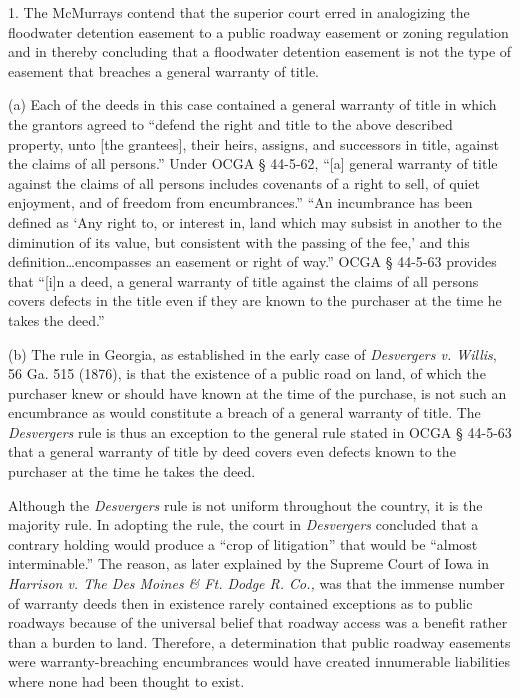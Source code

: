 1. The McMurrays contend that the superior court erred in analogizing the
floodwater detention easement to a public roadway easement or zoning regulation
and in thereby concluding that a floodwater detention easement is not the type
of easement that breaches a general warranty of title. 

(a) Each of the deeds in this case contained a general warranty of title in
which the grantors agreed to ``defend the right and title to the above
described property, unto [the grantees], their heirs, assigns, and successors
in title, against the claims of all persons.'' Under OCGA {\S} 44-5-62, ``[a]
general warranty of title against the claims of all persons includes covenants
of a right to sell, of quiet enjoyment, and of freedom from encumbrances.''
``An incumbrance has been defined as `Any right to, or interest in, land which
may subsist in another to the diminution of its value, but consistent with the
passing of the fee,' and this definition\ldots encompasses an easement or right
of way.'' OCGA {\S} 44-5-63 provides that ``[i]n a deed, a general warranty of
title against the claims of all persons covers defects in the title even if
they are known to the purchaser at the time he takes the deed.'' 

(b) The rule in Georgia, as established in the early case of \textit{Desvergers
v. Willis}, 56 Ga. 515 (1876), is that the existence of a public road on land,
of which the purchaser knew or should have known at the time of the purchase,
is not such an encumbrance as would constitute a breach of a general warranty
of title. The \textit{Desvergers }rule is thus an exception to the general rule
stated in OCGA {\S} 44-5-63 that a general warranty of title by deed covers
even defects known to the purchaser at the time he takes the deed. 

Although the \textit{Desvergers }rule is not uniform throughout the country, it
is the majority rule. In adopting the rule, the court in \textit{Desvergers
}concluded that a contrary holding would produce a ``crop of litigation'' that
would be ``almost interminable.'' The reason, as later explained by the Supreme
Court of Iowa in \textit{Harrison v. The Des Moines \& Ft. Dodge R. Co., }was
that the immense number of warranty deeds then in existence rarely contained
exceptions as to public roadways because of the universal belief that roadway
access was a benefit rather than a burden to land. Therefore, a determination
that public roadway easements were warranty-breaching encumbrances would have
created innumerable liabilities where none had been thought to exist. 

